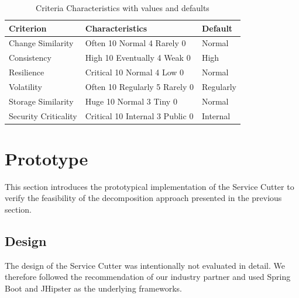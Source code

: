 \begin{table}[H]
	\centering
	\caption{Criteria Characteristics with values and defaults}
	\label{tab:characteristics}
	\begin{tabular}{|p{100pt}|p{80pt}|p{60pt}|}
		\hline	
		\textbf Criterion & Characteristics & Default\\
		\hline
		Change Similarity & Often 10 \newline Normal 4 \newline Rarely 0 & Normal\\
		\hline
		Consistency & High 10 \newline Eventually 4 \newline Weak 0 & High\\
		\hline
		Resilience & Critical 10 \newline Normal 4 \newline Low 0 & Normal\\
		\hline
		Volatility & Often 10 \newline Regularly 5 \newline Rarely 0 & Regularly \\
		\hline
		Storage Similarity & Huge 10 \newline Normal 3 \newline Tiny 0 & Normal\\
		\hline
		Security Criticality & Critical 10 \newline Internal 3 \newline Public 0 & Internal\\
		\hline
	\end{tabular}
\end{table}


\section{Prototype} 

This section introduces the prototypical implementation of the Service Cutter to verify the feasibility of the decomposition approach presented in the previous section.

\subsection{Design}

The design of the Service Cutter was intentionally not evaluated in detail. We therefore followed the recommendation of our industry partner and used Spring Boot\cite{springboot} and JHipster\cite{jhipster} as the underlying frameworks.

